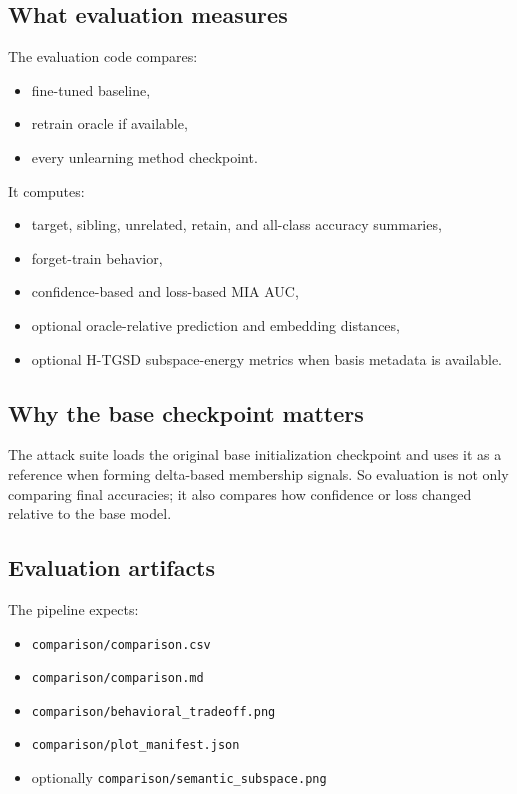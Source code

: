 \documentclass[10pt,a4paper]{article}
\begin{document}
\subsection{What evaluation measures}
The evaluation code compares:
\begin{itemize}
  \item fine-tuned baseline,
  \item retrain oracle if available,
  \item every unlearning method checkpoint.
\end{itemize}

It computes:
\begin{itemize}
  \item target, sibling, unrelated, retain, and all-class accuracy summaries,
  \item forget-train behavior,
  \item confidence-based and loss-based MIA AUC,
  \item optional oracle-relative prediction and embedding distances,
  \item optional H-TGSD subspace-energy metrics when basis metadata is available.
\end{itemize}

\subsection{Why the base checkpoint matters}
The attack suite loads the original base initialization checkpoint and uses it as a reference when forming delta-based membership signals. So evaluation is not only comparing final accuracies; it also compares how confidence or loss changed relative to the base model.

\subsection{Evaluation artifacts}
The pipeline expects:
\begin{itemize}
  \item \texttt{comparison/comparison.csv}
  \item \texttt{comparison/comparison.md}
  \item \texttt{comparison/behavioral\_tradeoff.png}
  \item \texttt{comparison/plot\_manifest.json}
  \item optionally \texttt{comparison/semantic\_subspace.png}
\end{itemize}
\end{document}
